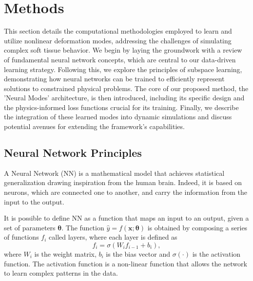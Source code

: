 \section{Methods}
\label{sec:methods}

This section details the computational methodologies employed to learn and utilize nonlinear deformation modes, addressing the challenges of simulating complex soft tissue behavior. We begin by laying the groundwork with a review of fundamental neural network concepts, which are central to our data-driven learning strategy. Following this, we explore the principles of subspace learning, demonstrating how neural networks can be trained to efficiently represent solutions to constrained physical problems. The core of our proposed method, the 'Neural Modes' architecture, is then introduced, including its specific design and the physics-informed loss functions crucial for its training. Finally, we describe the integration of these learned modes into dynamic simulations and discuss potential avenues for extending the framework's capabilities.



\subsection{Neural Network Principles}

A Neural Network (NN) is a mathematical model that achieves statistical generalization drawing inspiration from the human brain. Indeed, it is based on neurons, which are connected one to another, and carry the information from the input to the output.

It is possible to define NN as a function that maps an input to an output, given a set of parameters \( \bm{\theta} \). The function \( \hat{y} = f(\bm{x}; \bm{\theta}) \) is obtained by composing a series of functions \( f_i \) called layers, where each layer is defined as
\begin{equation}
    f_i = \sigma(W_i f_{i-1} + b_i),
\end{equation}
where \( W_i \) is the weight matrix, \( b_i \) is the bias vector and \( \sigma(\cdot) \) is the activation function. The activation function is a non-linear function that allows the network to learn complex patterns in the data. 

